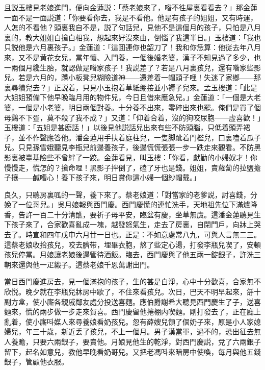 且説玉樓見老娘進門，便向金蓮説：「蔡老娘來了，喒不徃屋裏看看去？」那金蓮一面不是一面説道：「你要看你去，我是不看他。他是有孩子的姐姐，又有時運，人怎的不看他？頭裏我自不是，説了句話兒，見他不是這個月的孩子，只怕是八月裏的，教大姐姐白搶白相我，想起來好沒來由，倒惱了我這半日。」玉樓道：「我也只説他是六月裏孩子。」金蓮道：「這囬連你也韶刀了！我和你恁算：他従去年八月來，又不是黄花女兒，當年懷、入門養，一個後婚老婆，漢子不知見過了多少，也一兩個月纔生胎，就認做是喒家孩子！我説差了？若是八月裏孩兒，還有喒家些影兒。若是六月的，䠕小板凳兒糊險道神——還差着一帽頭子哩！失迷了家鄉——那裏尋犢兒去？」正説着，只見小玉抱着草紙绷接並小褥子兒來。孟玉樓道：「此是大姐姐預備下他早晚臨月用的物件兒，今日且借來應急兒。」金蓮道：「一個是大老婆，一個是小老婆，明日兩個對養。十分養不出來，零碎出來也罷。俺們是買了個母鷄不下疍，莫不殺了我不成？」又道：「仰着合着，沒的狗咬尿胞——虚喜歡！」玉樓道：「五姐是甚麽話！」以後見他説話兒出來有些不防頭腦，只低着頭弄裙子，並不作聲應答他。潘金蓮用手扶着庭柱兒，一隻脚跐着門檻兒，口裏嗑着瓜子兒。只見孫雪娥聽見李瓶兒前邊養孩子，後邊慌慌張張一步一跌走來觀看。不防黑影裏被臺基險些不曾絆了一跤。金蓮看見，叫玉樓：「你看，獻勤的小婦奴才！你慢慢走，慌怎的？搶命哩！黑影子拌倒了，磕了牙也是錢。姐姐，賣蘿蔔的拉鹽擔子攘——鹹嘈心！養下孩子來，明日賞你這小婦一個紗帽戴。」

良久，只聽房裏呱的一聲，養下來了。蔡老娘道：「對當家的老爹説，討喜錢，分娩了一位哥兒。」吳月娘報與西門慶。西門慶慌的連忙洗手，天地祖先位下滿爐降香，告許一百二十分清醮，要祈子母平安，臨盆有慶，坐草無虞。這潘金蓮聽見生下孩子來了，合家歡喜亂成一塊，越發怒氣生，走去了房裏，自閉門戶，向牀上哭去了。時宣和四年戊申六月廿一日也。正是：不如意處常八九，可與人言無二三。這蔡老娘收拾孩兒，咬去臍带，埋畢衣胞，熬了些定心湯，打發李瓶兒喫了，安頓孩兒停當。月娘讓老娘後邊管待酒飯。臨去，西門慶與了他五兩一錠銀子，許洗三朝來還與他一疋緞子。這蔡老娘千恩萬謝出門。

當日西門慶進房去，見一個滿抱的孩子，生的甚是白淨，心中十分歡喜，合家無不欣悦。晚夕就在李瓶兒牀房中歇了，不住來看孩兒。次日，巴天不明早起來，㧱十副方盒，使小廝各親戚鄰友處分投送喜麵。應伯爵謝希大聽見西門慶生了子，送喜麵來，慌的兩步做一步走來賀喜。西門慶留他捲棚内喫麵。剛打發去了，正在廳上亂着，使小廝呌媒人來尋養娘看奶孩兒。忽有薛嫂兒領了個奶子來，原是小人家媳婦兒，年三十歲，新近丢了孩兒，不上一個月。男子漢當軍，過不的，恐出征去無人養贍，只要六兩銀子，要賣他。月娘見他生的乾淨，對西門慶説，兌了六兩銀子留下，起名如意兒，教他早晚看奶哥兒。又把老馮呌來暗房中使喚，每月與他五錢銀子，管顧他衣服。

